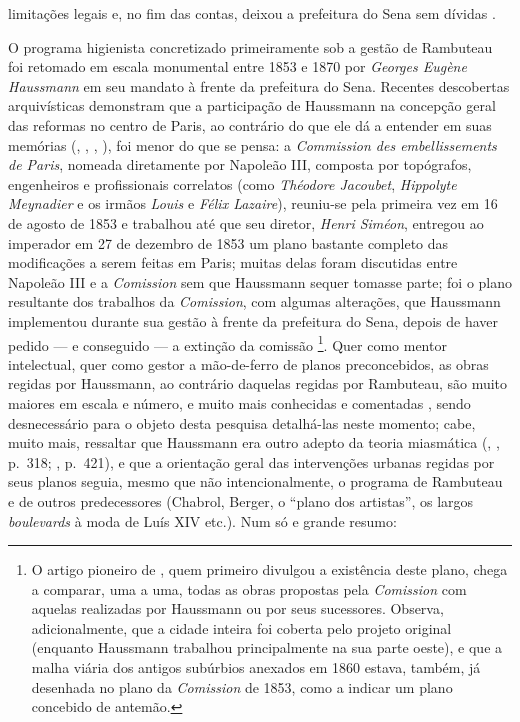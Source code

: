 limitações legais e, no fim das contas, deixou a prefeitura do Sena sem dívidas \cite[p.~399]{rambuteau1905memoires}. 

O programa higienista concretizado primeiramente sob a gestão de Rambuteau foi retomado em escala monumental entre 1853 e 1870 por \textit{Georges Eugène Haussmann} em seu mandato à frente da prefeitura do Sena. Recentes descobertas arquivísticas demonstram que a participação de Haussmann na concepção geral das reformas no centro de Paris, ao contrário do que ele dá a entender em suas memórias (\citeauthor{haussmann1890memoires-1}, \citeyear{haussmann1890memoires-1}, \citeyear{haussmann1890memoires-2}, \citeyear{haussmann1890memoires-3}), foi menor do que se pensa: a \textit{Commission des embellissements de Paris}, nomeada diretamente por Napoleão III, composta por topógrafos, engenheiros e profissionais correlatos (como \textit{Théodore Jacoubet}, \textit{Hippolyte Meynadier} e os irmãos \textit{Louis} e \textit{Félix Lazaire}), reuniu-se pela primeira vez em 16 de agosto de 1853 e trabalhou até que seu diretor, \textit{Henri Siméon}, entregou ao imperador em 27 de dezembro de 1853 um plano bastante completo das modificações a serem feitas em Paris; muitas delas foram discutidas entre Napoleão III e a \textit{Comission} sem que Haussmann sequer tomasse parte; foi o plano resultante dos trabalhos da \textit{Comission}, com algumas alterações, que Haussmann implementou durante sua gestão à frente da prefeitura do Sena, depois de haver pedido --- e conseguido --- a extinção da comissão \cite{bourillon_changer_1999,casselle_embel_1997}\footnote{O artigo pioneiro de , quem primeiro divulgou a existência deste plano, chega a comparar, uma a uma, todas as obras propostas pela \textit{Comission} com aquelas realizadas por Haussmann ou por seus sucessores. Observa, adicionalmente, que a cidade inteira foi coberta pelo projeto original (enquanto Haussmann trabalhou principalmente na sua parte oeste), e que a malha viária dos antigos subúrbios anexados em 1860 estava, também, já desenhada no plano da \textit{Comission} de 1853, como a indicar um plano concebido de antemão.}. Quer como mentor intelectual, quer como gestor a mão-de-ferro de planos preconcebidos, as obras regidas por Haussmann, ao contrário daquelas regidas por Rambuteau, são muito maiores em escala e número, e muito mais conhecidas e comentadas \cite{bourillon_changer_1999, casselle_embel_1997, dansette_haussmann_1972, faure_paris_2004, hourticq_haussmann_1971, petti_eurfranba_2011, pinkney_ordevpar_1955, pinkney_paris_1957, vossen_villes_1947}, sendo desnecessário para o objeto desta pesquisa detalhá-las neste momento; cabe, muito mais, ressaltar que Haussmann era outro adepto da teoria miasmática (\citeauthor{haussmann1890memoires-2}, \citeyear{haussmann1890memoires-2}, p.~318; \citeyear{haussmann1890memoires-3}, p.~421), e que a orientação geral das intervenções urbanas regidas por seus planos seguia, mesmo que não intencionalmente, o programa de Rambuteau e de outros predecessores (Chabrol, Berger, o ``plano dos artistas'', os largos \textit{boulevards} à moda de Luís XIV etc.). Num só e grande resumo:

